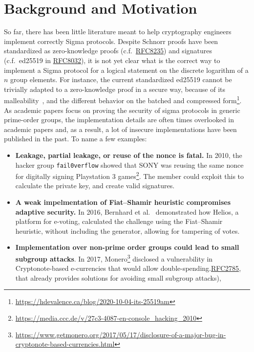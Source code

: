 \documentclass[runningheads]{llncs}
\begin{document}
\section{Background and Motivation}
\label{sec:motivation}
So far, there has been little literature meant to help cryptography engineers implement correctly Sigma protocols.
Despite Schnorr proofs have been standardized as zero-knowledge proofs (c.f.\ \href{https://tools.ietf.org/html/rfc8235}{RFC8235}) and signatures (c.f.\ ed25519 in \href{https://tools.ietf.org/html/rfc8032}{RFC8032}),
 it is not yet clear what is the correct way to implement a Sigma protocol for a logical statement on the discrete logarithm of a $n$ group elements.
 For instance, the current standardized ed25519 cannot be trivially adapted to a zero-knowledge proof in a secure way, because of its malleability~\cite[p. 7]{JCEng:BDLSY1},  and the different behavior on the batched and compressed form\footnote{\url{https://hdevalence.ca/blog/2020-10-04-its-25519am}}.
As academic papers focus on proving the security of sigma protocols in generic prime-order groups, the implementation details are often times overlooked in academic papers and, as a result, a lot of insecure implementations have been published in the past. To name a few examples:
\begin{itemize}
\item \textbf{Leakage, partial leakage, or reuse of the nonce is fatal.}
In 2010, the hacker group \texttt{fail0verflow} showed that SONY was reusing the same nonce for digitally signing Playstation 3 games\footnote{\url{https://media.ccc.de/v/27c3-4087-en-console_hacking_2010}}. The member could exploit this to calculate the private key, and create valid signatures.
\item \textbf{A weak impelmentation of Fiat--Shamir heuristic compromises adaptive security.} In 2016, Bernhard et al.~\cite{??} demonstrated how Helios, a platform for e-voting, calculated the challenge using the Fiat--Shamir heuristic, without including the generator, allowing for tampering of votes.

\item \textbf{Implementation over non-prime order groups could lead to small subgroup attacks}. In 2017, Monero\footnote{\url{https://www.getmonero.org/2017/05/17/disclosure-of-a-major-bug-in-cryptonote-based-currencies.html}} disclosed a vulnerability in Cryptonote-based e-currencies that would allow double-spending.\href{https://tools.ietf.org/html/rfc2785#ref-LAW}{RFC2785}, that already provides solutions for avoiding small subgroup attacks),
\end{itemize}
\end{document}

